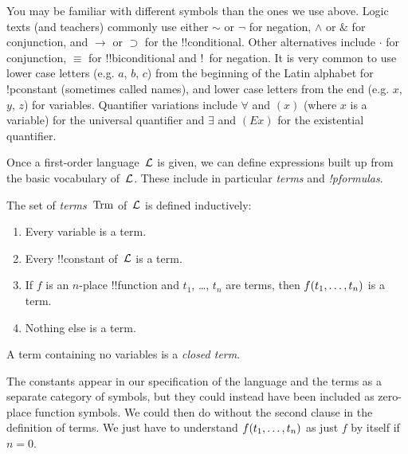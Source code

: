 \documentclass[open-logic-section]{subfiles}
\begin{document}

\begin{intro}
You may be familiar with different symbols than the ones we use
above. Logic texts (and teachers) commonly use either $\sim$ or $\neg$
for negation, $\wedge$ or $\&$ for conjunction, and $\rightarrow$ or
$\supset$ for the !!{conditional}. Other alternatives include $\cdot$ for
conjunction, $\equiv$ for !!{biconditional} and !~for negation. It is very
common to use lower case letters (e.g. $a$, $b$, $c$) from the
beginning of the Latin alphabet for !p{constant} (sometimes called
names), and lower case letters from the end (e.g. $x$, $y$, $z$)
for variables. Quantifier variations include $\forall$ and $(x)$
(where $x$ is a variable) for the universal quantifier and
$\exists$ and $(Ex)$ for the existential quantifier.
\end{intro}


\begin{wordy}
Once a first-order language~$\mathcal L$ is given, we can define
expressions built up from the basic vocabulary of~$\mathcal L$.  These
include in particular \emph{terms} and \emph{!p{formulas}}.
\end{wordy}

\begin{defn}[Term]
The set of \emph{terms}~$\Trm$ of~$\mathcal L$ is
defined inductively:
\begin{enumerate}
\item Every variable is a term.
\item Every !!{constant} of~$\mathcal L$ is a term.
\item If $f$ is an $n$-place !!{function} and $t_1$, \dots, $t_n$
  are terms, then ${ f(t_1, \ldots, t_n) }$ is a term.
\item Nothing else is a term.
\end{enumerate}
A term containing no variables is a \emph{closed term}.
\end{defn}

\begin{wordy}
The constants appear in our specification of the language and the
terms as a separate category of symbols, but they could instead have
been included as zero-place function symbols.  We could then do
without the second clause in the definition of terms. We just have to
understand ${ f(t_1, \ldots, t_n) }$ as just $f$ by itself if $n =
0$.
\end{wordy}
\end{document}
